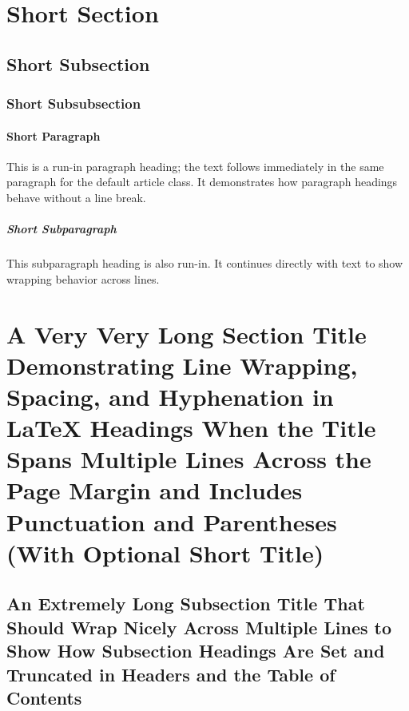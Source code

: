 %

\section{Short Section}
\lipsum[1-2]

\subsection{Short Subsection}
\lipsum[3]

\subsubsection{Short Subsubsection}
\lipsum[4]

\paragraph{Short Paragraph} This is a run-in paragraph heading; the text follows immediately in the same paragraph for the default article class. It demonstrates how paragraph headings behave without a line break.

\subparagraph{Short Subparagraph} This subparagraph heading is also run-in. It continues directly with text to show wrapping behavior across lines.

\section[Long section (short TOC)]{A Very Very Long Section Title Demonstrating Line Wrapping, Spacing, and Hyphenation in LaTeX Headings When the Title Spans Multiple Lines Across the Page Margin and Includes Punctuation and Parentheses (With Optional Short Title)}
\lipsum[5-6]

\subsection[Long subsection (short TOC)]{An Extremely Long Subsection Title That Should Wrap Nicely Across Multiple Lines to Show How Subsection Headings Are Set and Truncated in Headers and the Table of Contents}
\lipsum[7]

